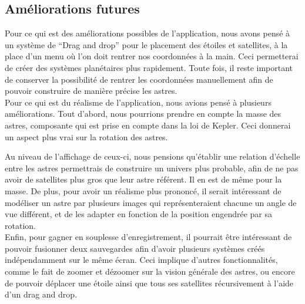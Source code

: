 \documentclass[a4paper,10pt]{article}
\begin{document}
\subsection{Améliorations futures}
Pour ce qui est des améliorations possibles de l'application, nous avons pensé à un système de ``Drag and drop'' pour le placement des étoiles et satellites, à la place d'un menu où l'on doit rentrer nos coordonnées à la main. Ceci permetterai de créer des systèmes planétaires plus rapidement. Toute fois, il reste important de conserver la possibilité de rentrer les coordonnées manuellement afin de pouvoir construire de manière précise les astres.\\

Pour ce qui est du réalisme de l'application, nous avions pensé à plusieurs améliorations. Tout d'abord, nous pourrions prendre en compte la masse des astres, composante qui est prise en compte dans la loi de Kepler. Ceci donnerai un aspect plus vrai sur la rotation des astres. 

Au niveau de l'affichage de ceux-ci, nous pensions qu'établir une relation d'échelle entre les astres permettrais de construire un univers plus probable, afin de ne pas avoir de satellites plus gros que leur astre référent. Il en est de même pour la masse. De plus, pour avoir un réalisme plus prononcé, il serait intéressant de modéliser un astre par plusieurs images qui représenteraient chacune un angle de vue différent, et de les adapter en fonction de la position engendrée par sa rotation.\\

Enfin, pour gagner en souplesse d'enregistrement, il pourrait être intéressant de pouvoir fusionner deux sauvegardes afin d'avoir plusieurs systèmes créés indépendamment sur le même écran. Ceci implique d'autres fonctionnalités, comme le fait de zoomer et dézoomer sur la vision générale des astres, ou encore de pouvoir déplacer une étoile ainsi que tous ses satellites récursivement à l'aide d'un drag and drop.
\end{document}
